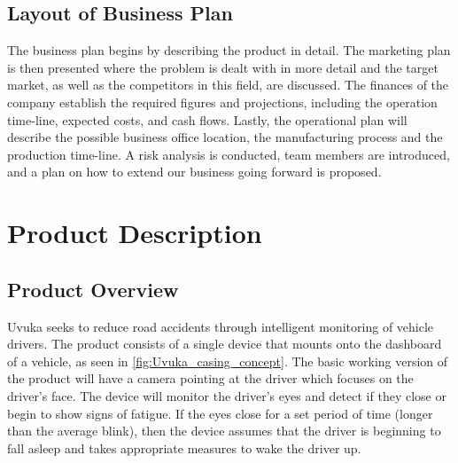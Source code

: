 \section{Layout of Business Plan}
The business plan begins by describing the product in detail. The marketing plan is then presented where the problem is dealt with in more detail and the target market, as well as the competitors in this field, are discussed. The finances of the company establish the required figures and projections, including the operation time-line, expected costs, and cash flows. Lastly, the operational plan will describe the possible business office location, the manufacturing process and the production time-line. A risk analysis is conducted, team members are introduced, and a plan on how to extend our business going forward is proposed.

\newpage 
\chapter{Product Description}
\section{Product Overview}
Uvuka seeks to reduce road accidents through intelligent monitoring of vehicle drivers. The product consists of a single device that mounts onto the dashboard of a vehicle, as seen in \cref{fig:Uvuka_casing_concept}. The basic working version of the product will have a camera pointing at the driver which focuses on the driver's face. The device will monitor the driver's eyes and detect if they close or begin to show signs of fatigue. If the eyes close for a set period of time (longer than the average blink), then the device assumes that the driver is beginning to fall asleep and takes appropriate measures to wake the driver up.

